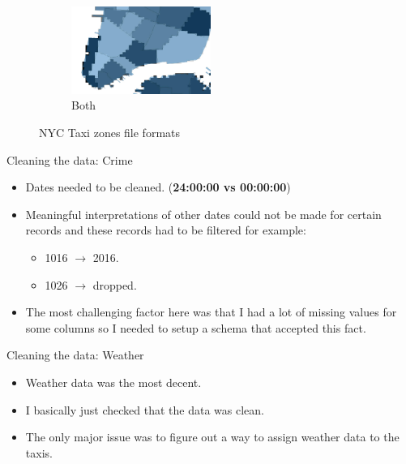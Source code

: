 \documentclass[10pt,ignorenonframetext,]{beamer}
\providecommand{\tightlist}{%
  \setlength{\itemsep}{0pt}\setlength{\parskip}{0pt}}
\begin{document}
\begin{frame}

\begin{figure}
    \begin{subfigure}[t]{0.8\textwidth}
        \centering
        \label{fig:zones_both}
        \includegraphics[width=0.5\textwidth]{../latex/images/both}
        \caption{Both}
    \end{subfigure}
    \caption{NYC Taxi zones file formats}
\end{figure}

\end{frame}

\begin{frame}

\begin{block}{Cleaning the data: Crime}

\begin{itemize}
\item
  Dates needed to be cleaned. (\textbf{24:00:00 vs 00:00:00})
\item
  Meaningful interpretations of other dates could not be made for
  certain records and these records had to be filtered for example:

  \begin{itemize}
  \tightlist
  \item
    1016 \(\rightarrow\) 2016.
  \item
    1026 \(\rightarrow\) dropped.
  \end{itemize}
\item
  The most challenging factor here was that I had a lot of missing
  values for some columns so I needed to setup a schema that accepted
  this fact.
\end{itemize}

\end{block}

\begin{block}{Cleaning the data: Weather}

\begin{itemize}
\tightlist
\item
  Weather data was the most decent.
\item
  I basically just checked that the data was clean.
\item
  The only major issue was to figure out a way to assign weather data to
  the taxis.
\end{itemize}

\end{block}

\end{frame}
\end{document}
